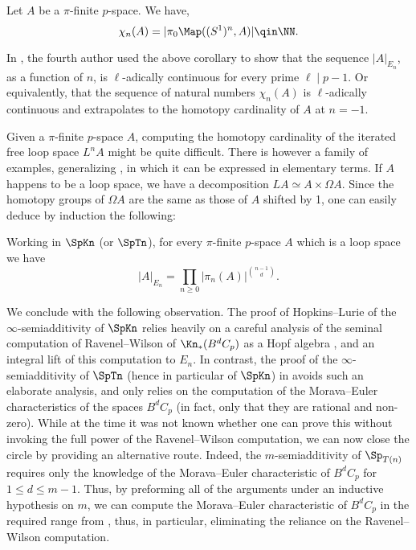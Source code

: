 \documentclass[english]{article}
\begin{document}
\begin{cor}
    Let $A$ be a $\pi$-finite $p$-space. We have,
    \[
        \chi_n(A) = 
        |\pi_0 \Map((S^1)^n,A)|
        \qin \NN.
    \]
\end{cor}

\begin{rem}
    In \cite{yanovski2023homotopy}, the fourth author used the above corollary to show that the sequence $|A|_{E_n}$, as a function of $n$, is $\ell$-adically continuous for every prime $\ell \mid p-1$. Or equivalently, that the sequence of natural numbers $\chi_n(A)$ is $\ell$-adically continuous and extrapolates to the homotopy cardinality of $A$ at $n = -1$.
\end{rem}

Given a $\pi$-finite $p$-space $A$, computing the homotopy cardinality of the iterated free loop space $L^nA$ might be quite difficult. There is however a family of examples, generalizing  , in which it can be expressed in elementary terms. If $A$ happens to be a loop space, we have a decomposition $LA \simeq A \times \Omega A$. Since the homotopy groups of $\Omega A$ are the same as those of $A$ shifted by 1, one can easily deduce by induction the following:

\begin{example}\label{Ex_Card_Loop}
    Working in $\SpKn$ (or $\SpTn$), for every $\pi$-finite $p$-space $A$ which is a loop space we have
    \[
        |A|_{E_n} = 
        \prod_{n \ge 0} |\pi_n(A)|^{\binom{n-1}{d}}.
    \]
\end{example} 

We conclude with the following observation. 
The proof of Hopkins--Lurie of the $\infty$-semiadditivity of $\SpKn$ relies heavily on a careful analysis of the seminal computation of Ravenel--Wilson of $\Kn_*(B^dC_p)$ as a Hopf algebra \cite{ravenelwilson1980}, and an integral lift of this computation to $E_n$. In contrast, the proof of the $\infty$-semiadditivity of $\SpTn$ (hence in particular of $\SpKn$) in \cite{TeleAmbi} avoids such an elaborate analysis, and only relies on the computation of the Morava--Euler characteristics of the spaces $B^dC_p$ (in fact, only that they are rational and non-zero). While at the time it was not known whether one can prove this without invoking the full power of the Ravenel--Wilson computation, we can now close the circle by providing an alternative route. 
Indeed, the $m$-semiadditivity of $\Sp_{T(n)}$ requires only the knowledge of the Morava--Euler characteristic of $B^dC_p$ for $1\le d \le m-1$. 
Thus, by preforming all of the arguments under an inductive hypothesis on $m$, we can compute the Morava--Euler characteristic of $B^dC_p$ in the required range from , thus, in particular, eliminating the reliance on the Ravenel--Wilson computation.
\end{document}
